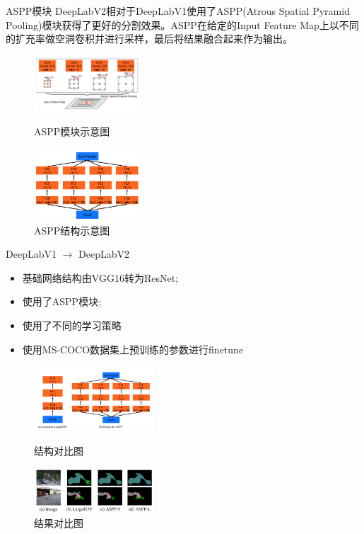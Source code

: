 \documentclass{beamer}
\begin{document}
\begin{frame}{ASPP模块}
DeepLabV2相对于DeepLabV1使用了ASPP(Atrous Spatial Pyramid Pooling)模块获得了更好的分割效果。ASPP在给定的Input Feature Map上以不同的扩充率做空洞卷积并进行采样，最后将结果融合起来作为输出。

\begin{figure}[h]
	\centering
	\begin{minipage}[t]{0.4\textwidth}
		\centering
		\includegraphics[width=4cm]{images/aspp1.png}
		\caption{\label{aspp1}ASPP模块示意图}
	\end{minipage}
	\begin{minipage}[t]{0.4\textwidth}
		\centering
		\includegraphics[width=4cm]{images/aspp2.png}
		\caption{\label{aspp2}ASPP结构示意图}
	\end{minipage}
\end{figure}

\end{frame}

\begin{frame}{DeepLabV1 $\to$ DeepLabV2}
\begin{itemize}
	\item 基础网络结构由VGG16转为ResNet;
	\item 使用了ASPP模块;
	\item 使用了不同的学习策略
	\item 使用MS-COCO数据集上预训练的参数进行finetune
\end{itemize}

\begin{figure}[h]
	\centering
	\begin{minipage}[t]{0.4\textwidth}
		\centering
		\includegraphics[width=4.5cm]{images/v1vsv2.png}
		\caption{\label{v1vsv2}结构对比图}
	\end{minipage}
	\begin{minipage}[t]{0.4\textwidth}
		\centering
		\includegraphics[width=4.5cm]{images/v1vsv2res.png}
		\caption{\label{v1vsv2res}结果对比图}
	\end{minipage}
\end{figure}
\end{frame}
\end{document}
